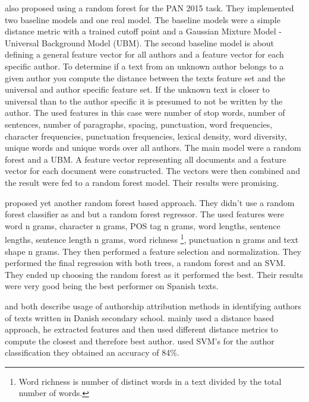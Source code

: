 \cite{pacheco2015} also proposed using a random forest for the PAN 2015 task.
They implemented two baseline models and one real model. The baseline models
were a simple distance metric with a trained cutoff point and a Gaussian Mixture
Model - Universal Background Model (UBM). The second baseline model is about
defining a general feature vector for all authors and a feature vector for
each specific author. To determine if a text from an unknown author belongs
to a given author you compute the distance between the texts feature set and
the universal and author specific feature set. If the unknown text is closer
to universal than to the author specific it is presumed to not be written by
the author. The used features in this case were number of stop words, number
of sentences, number of paragraphs, spacing, punctuation, word frequencies,
character frequencies, punctuation frequencies, lexical density, word diversity,
unique words and unique words over all authors. The main model were a random
forest and a UBM. A feature vector representing all documents and a feature
vector for each document were constructed. The vectors were then combined and
the result were fed to a random forest model. Their results were promising.

\cite{bartoli2015b} proposed yet another random forest based approach.
They didn't use a random forest classifier as \cite{maitra2015} and
\cite{pacheco2015} but a random forest regressor. The used features were word n
grams, character n grams, \gls{POS} tag n grams, word lengths, sentence lengths,
sentence length n grams, word richness \footnote{Word richness is number of
distinct words in a text divided by the total number of words.}, punctuation
n grams and text shape n grams. They then performed a feature selection and
normalization. They performed the final regression with both trees, a random
forest and an SVM. They ended up choosing the random forest as it performed the
best. Their results were very good being the best performer on Spanish texts.



\cite{hansen2014} and \cite{aalykke2016} both describe usage of authorship
attribution methods in identifying authors of texts written in Danish secondary
school. \cite{aalykke2016} mainly used a distance based approach, he extracted
features and then used different distance metrics to compute the closest and
therefore best author. \cite{hansen2014} used SVM's for the author
classification they obtained an accuracy of 84\%.
